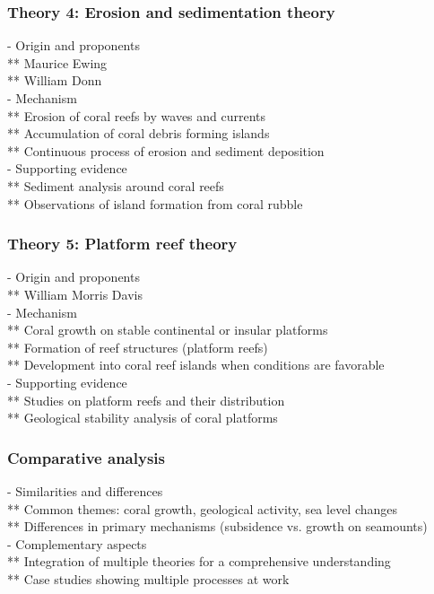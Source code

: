 \subsubsection{Theory 4: Erosion and sedimentation theory}
- Origin and proponents \\
** Maurice Ewing \\
** William Donn \\
- Mechanism \\
** Erosion of coral reefs by waves and currents \\
** Accumulation of coral debris forming islands \\
** Continuous process of erosion and sediment deposition \\
- Supporting evidence \\
** Sediment analysis around coral reefs \\
** Observations of island formation from coral rubble

\subsubsection{Theory 5: Platform reef theory}
- Origin and proponents \\
** William Morris Davis \\
- Mechanism \\
** Coral growth on stable continental or insular platforms \\
** Formation of reef structures (platform reefs) \\
** Development into coral reef islands when conditions are favorable \\
- Supporting evidence \\
** Studies on platform reefs and their distribution \\
** Geological stability analysis of coral platforms

\subsubsection{Comparative analysis}
- Similarities and differences \\
** Common themes: coral growth, geological activity, sea level changes \\
** Differences in primary mechanisms (subsidence vs. growth on seamounts) \\
- Complementary aspects \\
** Integration of multiple theories for a comprehensive understanding \\
** Case studies showing multiple processes at work 

